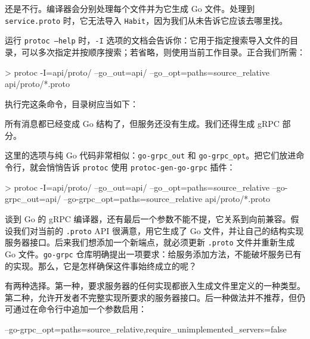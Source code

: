 还是不行。编译器会分别处理每个文件并为它生成 Go 文件。处理到 \texttt{service.proto} 时，它无法导入 \texttt{Habit}，因为我们从未告诉它应该去哪里找。

运行 \texttt{protoc --help} 时，\texttt{-I} 选项的文档会告诉你：它用于指定搜索导入文件的目录，可以多次指定并按顺序搜索；若省略，则使用当前工作目录。正合我们所需：

\begin{shellcode}[]
> protoc -I=api/proto/ --go_out=api/ --go_opt=paths=source_relative
    api/proto/*.proto
\end{shellcode}

执行完这条命令，目录树应当如下：

\begin{treebox}
\end{treebox}

所有消息都已经变成 Go 结构了，但服务还没有生成。我们还得生成 gRPC 部分。

这里的选项与纯 Go 代码非常相似：\texttt{go-grpc\_out} 和 \texttt{go-grpc\_opt}。把它们放进命令行，就会悄悄告诉 \texttt{protoc} 使用 \texttt{protoc-gen-go-grpc} 插件：

\begin{shellcode}[]
> protoc -I=api/proto/ --go_out=api/ --go_opt=paths=source_relative
    --go-grpc_out=api/ --go-grpc_opt=paths=source_relative
    api/proto/*.proto
\end{shellcode}

谈到 Go 的 gRPC 编译器，还有最后一个参数不能不提，它关系到向前兼容。假设我们对当前的 \texttt{.proto} API 很满意，用它生成了 Go 文件，并让自己的结构实现服务器接口。后来我们想添加一个新端点，就必须更新 \texttt{.proto} 文件并重新生成 Go 文件。\texttt{go-grpc} 仓库明确提出一项要求：给服务添加方法，不能破坏服务已有的实现。那么，它是怎样确保这件事始终成立的呢？

有两种选择。第一种，要求服务器的任何实现都嵌入生成文件里定义的一种类型。第二种，允许开发者不完整实现所要求的服务器接口。后一种做法并不推荐，但仍可通过在命令行中追加一个参数启用：

\begin{shellcode}[]
--go-grpc_opt=paths=source_relative,require_unimplemented_servers=false
\end{shellcode}

